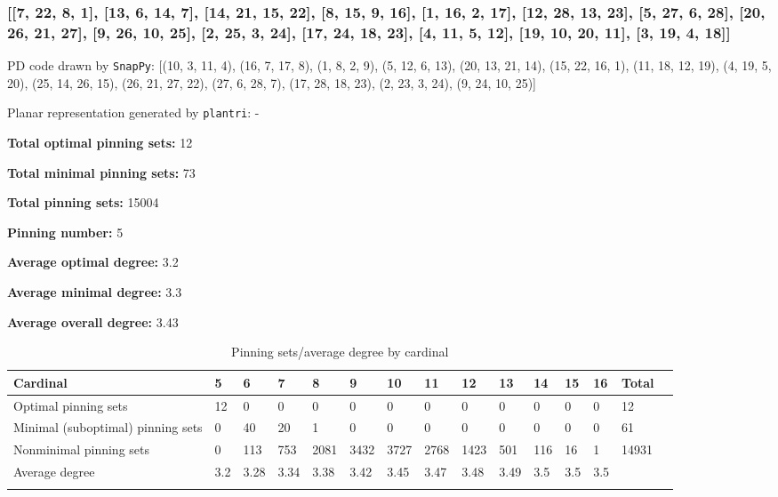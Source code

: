 \documentclass{article}%
\begin{document}
\newpage

\subsubsection{[[7, 22, 8, 1], [13, 6, 14, 7], [14, 21, 15, 22], [8, 15, 9, 16], [1, 16, 2, 17], [12, 28, 13, 23], [5, 27, 6, 28], [20, 26, 21, 27], [9, 26, 10, 25], [2, 25, 3, 24], [17, 24, 18, 23], [4, 11, 5, 12], [19, 10, 20, 11], [3, 19, 4, 18]]}

{\small\noindent PD code drawn by \texttt{SnapPy}: [(10, 3, 11, 4), (16, 7, 17, 8), (1, 8, 2, 9), (5, 12, 6, 13), (20, 13, 21, 14), (15, 22, 16, 1), (11, 18, 12, 19), (4, 19, 5, 20), (25, 14, 26, 15), (26, 21, 27, 22), (27, 6, 28, 7), (17, 28, 18, 23), (2, 23, 3, 24), (9, 24, 10, 25)]}

{\small\noindent Planar representation generated by \texttt{plantri}: -}

\begin{multicols}{2}
{\normalsize \noindent\textbf{Total optimal pinning sets:} 12

\noindent\textbf{Total minimal pinning sets:} 73

\noindent\textbf{Total pinning sets:} 15004

\noindent\textbf{Pinning number:} 5

}
\columnbreak

{\normalsize \noindent\textbf{Average optimal degree:} 3.2

\noindent\textbf{Average minimal degree:} 3.3

\noindent\textbf{Average overall degree:} 3.43

}
\end{multicols}

\begin{table}[ht]
	\caption{Pinning sets/average degree by cardinal}
	\centering
	\renewcommand{\arraystretch}{1.5}
	\begin{tabularx}{\textwidth}{lXXXXXXXXXXXXXX}
		\toprule
			Cardinal & 5 & 6 & 7 & 8 & 9 & 10 & 11 & 12 & 13 & 14 & 15 & 16 & Total\\
			\hline
			Optimal pinning sets & 12 & 0 & 0 & 0 & 0 & 0 & 0 & 0 & 0 & 0 & 0 & 0 & 12 \\
			Minimal (suboptimal) pinning sets & 0 & 40 & 20 & 1 & 0 & 0 & 0 & 0 & 0 & 0 & 0 & 0 & 61 \\
			Nonminimal pinning sets & 0 & 113 & 753 & 2081 & 3432 & 3727 & 2768 & 1423 & 501 & 116 & 16 & 1 & 14931 \\
			Average degree & 3.2 & 3.28 & 3.34 & 3.38 & 3.42 & 3.45 & 3.47 & 3.48 & 3.49 & 3.5 & 3.5 & 3.5 &  \\
		\bottomrule \\ 
	\end{tabularx}
\end{table}
\end{document}
